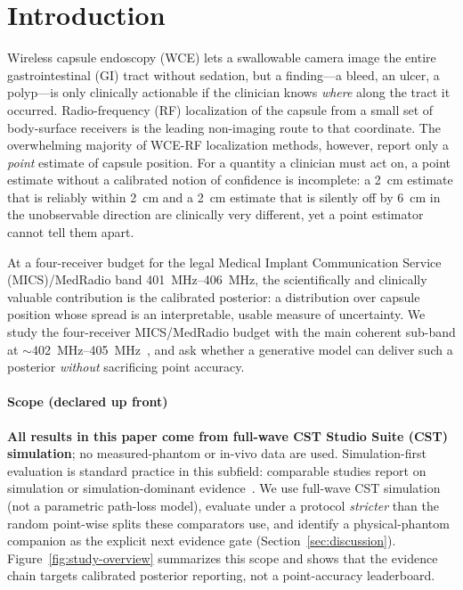 \section{Introduction}\label{sec:intro}

Wireless capsule endoscopy (WCE) lets a swallowable camera image the entire
gastrointestinal (GI) tract without sedation, but a finding---a bleed, an
ulcer, a polyp---is only clinically actionable if the clinician knows
\emph{where} along the tract it occurred. Radio-frequency (RF) localization of
the capsule from a small set of body-surface receivers is the leading
non-imaging route to that coordinate. The overwhelming majority of WCE-RF
localization methods, however, report only a \emph{point} estimate of capsule
position. For a quantity a clinician must act on, a point estimate without a
calibrated notion of confidence is incomplete: a \SI{2}{cm} estimate that is
reliably within \SI{2}{cm} and a \SI{2}{cm} estimate that is silently off by
\SI{6}{cm} in the unobservable direction are clinically very different, yet a
point estimator cannot tell them apart.

At a four-receiver budget for the legal Medical Implant Communication Service
(MICS)/MedRadio band \SIrange{401}{406}{MHz}, the scientifically and clinically
valuable contribution is the calibrated posterior: a distribution over capsule
position whose spread is an interpretable, usable measure of uncertainty. We
study the four-receiver MICS/MedRadio budget with the main coherent sub-band at
${\sim}$\SIrange{402}{405}{MHz}~\cite{mics}, and ask whether a generative model
can deliver such a posterior \emph{without} sacrificing point accuracy.

\paragraph*{Scope (declared up front)}
\textbf{All results in this paper come from full-wave CST Studio Suite (CST) simulation};
no measured-phantom or in-vivo data are used. Simulation-first evaluation is
standard practice in this subfield: comparable studies report on simulation or
simulation-dominant evidence~\cite{yoshitake2022,wisanmongkol2024,ye2014,nadimi2014,pourhomayoun2014,hiyoshi2019}.
We use full-wave CST simulation (not a parametric path-loss model), evaluate
under a protocol \emph{stricter} than the random point-wise splits these
comparators use, and identify a physical-phantom companion as the explicit next
evidence gate (Section~\ref{sec:discussion}).
Figure~\ref{fig:study-overview} summarizes this scope and shows that the
evidence chain targets calibrated posterior reporting, not a point-accuracy
leaderboard.

